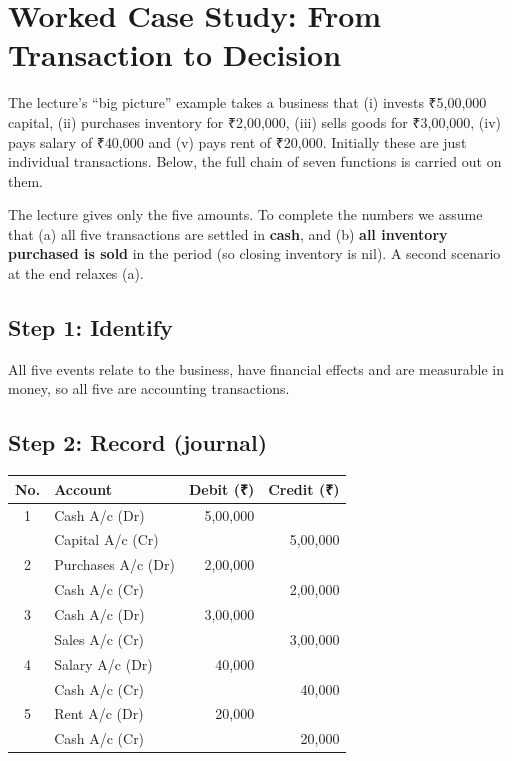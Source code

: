 \documentclass[11pt,a4paper]{article}
\newcommand{\Rs}{{\rsfont ₹}}
\begin{document}
\section{Worked Case Study: From Transaction to Decision}

The lecture's ``big picture'' example takes a business that
(i) invests \Rs 5,00,000 capital, (ii) purchases inventory for \Rs 2,00,000, (iii) sells goods
for \Rs 3,00,000, (iv) pays salary of \Rs 40,000 and (v) pays rent of \Rs 20,000.
Initially these are just individual transactions. Below, the full chain of seven functions is
carried out on them.

\begin{notebox}
The lecture gives only the five amounts. To complete the numbers we assume that
(a) all five transactions are settled in \textbf{cash}, and (b) \textbf{all inventory purchased is
sold} in the period (so closing inventory is nil). A second scenario at the end relaxes (a).
\end{notebox}

\subsection{Step 1: Identify}
All five events relate to the business, have financial effects and are measurable in money, so
all five are accounting transactions.

\subsection{Step 2: Record (journal)}

\begin{center}
\small
\begin{tabular}{@{}c l r r@{}}
\toprule
\rowcolor{acteal!15}\textbf{No.} & \textbf{Account} & \textbf{Debit (\Rs)} & \textbf{Credit (\Rs)}\\
\midrule
1 & Cash A/c \hfill (Dr) & 5,00,000 & \\
  & \quad Capital A/c \hfill (Cr) & & 5,00,000\\
\midrule
2 & Purchases A/c \hfill (Dr) & 2,00,000 & \\
  & \quad Cash A/c \hfill (Cr) & & 2,00,000\\
\midrule
3 & Cash A/c \hfill (Dr) & 3,00,000 & \\
  & \quad Sales A/c \hfill (Cr) & & 3,00,000\\
\midrule
4 & Salary A/c \hfill (Dr) & 40,000 & \\
  & \quad Cash A/c \hfill (Cr) & & 40,000\\
\midrule
5 & Rent A/c \hfill (Dr) & 20,000 & \\
  & \quad Cash A/c \hfill (Cr) & & 20,000\\
\bottomrule
\end{tabular}
\end{center}
\end{document}
